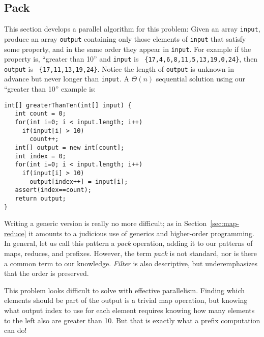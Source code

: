 \documentclass[10pt]{article}
\begin{document}
\subsection{Pack}
\label{sec:pack}

This section develops a parallel algorithm for this problem: Given an array
{\tt input}, produce an array {\tt output} containing only those
elements of {\tt input} that satisfy some property, and in the same
order they appear in {\tt input}.  For example if the property is,
``greater than 10'' and {\tt input} is {\tt
  \{17,4,6,8,11,5,13,19,0,24\}}, then {\tt output} is {\tt
  \{17,11,13,19,24\}}.  Notice the length of {\tt output} is unknown in
advance but never longer than {\tt input}.  A $\Theta(n)$ sequential
solution using our ``greater than 10'' example is:

\begin{verbatim}
int[] greaterThanTen(int[] input) {
   int count = 0;
   for(int i=0; i < input.length; i++)
     if(input[i] > 10)
       count++;
   int[] output = new int[count];
   int index = 0;
   for(int i=0; i < input.length; i++)
     if(input[i] > 10)
       output[index++] = input[i];
   assert(index==count);
   return output;
}
\end{verbatim}
Writing a generic version is really no more difficult; as in
Section~\ref{sec:map-reduce} it amounts to a judicious use of generics
and higher-order programming.  In general, let us call this pattern a
\emph{pack} operation, adding it to our patterns of maps, reduces, and
prefixes.  However, the term \emph{pack} is not standard, nor is there
a common term to our knowledge.  \emph{Filter} is also descriptive,
but underemphasizes that the order is preserved.

This problem looks difficult to solve with effective
parallelism.  Finding which elements should be part of the output is a
trivial map operation, but knowing what output index to
use for each element requires knowing how many elements to the left
also are greater than 10.  But that is exactly what a prefix
computation can do!
\end{document}
